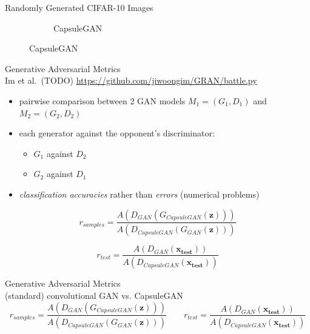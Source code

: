 \documentclass{beamer}
\newcommand{\gamCitation}{
  Im et al.~(TODO)
}
\begin{document}
{\begin{frame}{Randomly Generated CIFAR-10 Images}
\begin{figure}
\begin{subfigure}{.49\textwidth}
          \caption{CapsuleGAN}
          \label{fig:capsgan_cifar10_randomly_generated}
        \end{subfigure}
      \end{figure}
    \end{frame}

    \begin{frame}{Generative Adversarial Metrics\\
        \tiny \gamCitation \url{https://github.com/jiwoongim/GRAN/battle.py}}
      \pause
      \begin{itemize}[<+- | alert@+>]
        \item pairwise comparison between 2 GAN models $M_1 = (G_1, D_1)$ and $M_2 = (G_2, D_2)$ 
        \item each generator against the opponent's discriminator:
          \begin{itemize}[<+- | alert@+>]
            \item $G_1$ against $D_2$
            \item $G_2$ against $D_1$
          \end{itemize}
        \item \emph{classification accuracies} rather than \emph{errors} (numerical problems)
      \end{itemize}
      \pause

      \begin{equation*}
        r_{samples} = \frac{A(D_{GAN}(G_{CapsuleGAN}(\mathbf{z})))}{A(D_{CapsuleGAN}(G_{GAN}(\mathbf{z})))}
      \end{equation*}
      \pause

      \begin{equation*}
        r_{test} = \frac{A(D_{GAN}(\mathbf{x_{test}}))}{A(D_{CapsuleGAN}(\mathbf{x_{test}}))}
      \end{equation*}
    \end{frame}

    \begin{frame}{Generative Adversarial Metrics\\
        \tiny (standard) convolutional GAN vs. CapsuleGAN}
      \pause
      \begin{equation*}
        r_{samples} = \frac{A(D_{GAN}(G_{CapsuleGAN}(\mathbf{z})))}{A(D_{CapsuleGAN}(G_{GAN}(\mathbf{z})))}
        \qquad
        r_{test} = \frac{A(D_{GAN}(\mathbf{x_{test}}))}{A(D_{CapsuleGAN}(\mathbf{x_{test}}))}
      \end{equation*}
      \pause


\end{frame}}
\end{document}
